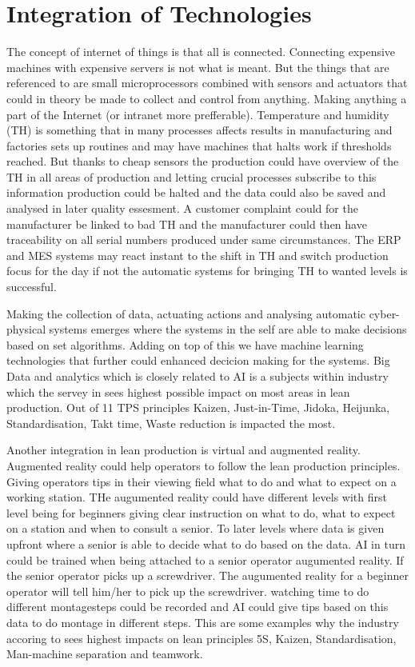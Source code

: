 \documentclass[article,a4paper]{IEEEtran}
\begin{document}
    \section{Integration of Technologies}
    The concept of internet of things is that all is connected. Connecting expensive machines with expensive servers is not what is meant. But the things that are referenced to are small microprocessors combined with sensors and actuators that could in theory be made to collect and control from anything. Making anything a part of the Internet (or intranet more prefferable). Temperature and humidity (TH) is something that in many processes affects results in manufacturing and factories sets up routines and may have machines that halts work if thresholds reached. But thanks to cheap sensors the production could have overview of the TH in all areas of production and letting crucial processes subscribe to this information production could be halted and the data could also be saved and analysed in later quality essesment. A customer complaint could for the manufacturer be linked to bad TH and the manufacturer could then have traceability on all serial numbers produced under same circumstances. The ERP and MES systems may react instant to the shift in TH and switch production focus for the day if not the automatic systems for bringing TH to wanted levels is successful. 

    Making the collection of data, actuating actions and analysing automatic cyber-physical systems emerges where the systems in the self are able to make decisions based on set algorithms. Adding on top of this we have machine learning technologies that further could enhanced decicion making for the systems. Big Data and analytics which is closely related to AI is a subjects within industry which the servey in \cite{Impact_Lean_Prod} sees highest possible impact on most areas in lean production. Out of 11 TPS principles Kaizen, Just-in-Time, Jidoka, Heijunka, Standardisation, Takt time, Waste reduction is impacted the most. 

    Another integration in lean production is virtual and augmented reality. Augmented reality could help operators to follow the lean production principles. Giving operators tips in their viewing field what to do and what to expect on a working station. THe augumented reality could have different levels with first level being for beginners giving clear instruction on what to do, what to expect on a station and when to consult a senior. To later levels where data is given upfront where a senior is able to decide what to do based on the data. AI in turn could be trained when being attached to a senior operator augumented reality. If the senior operator picks up a screwdriver. The augumented reality for a beginner operator will tell him/her to pick up the screwdriver. watching time to do different montagesteps could be recorded and AI could give tips based on this data to do montage in different steps. This are some examples why the industry accoring to \cite{Impact_Lean_Prod} sees highest impacts on lean principles 5S, Kaizen, Standardisation, Man-machine separation and teamwork.  
\end{document}
